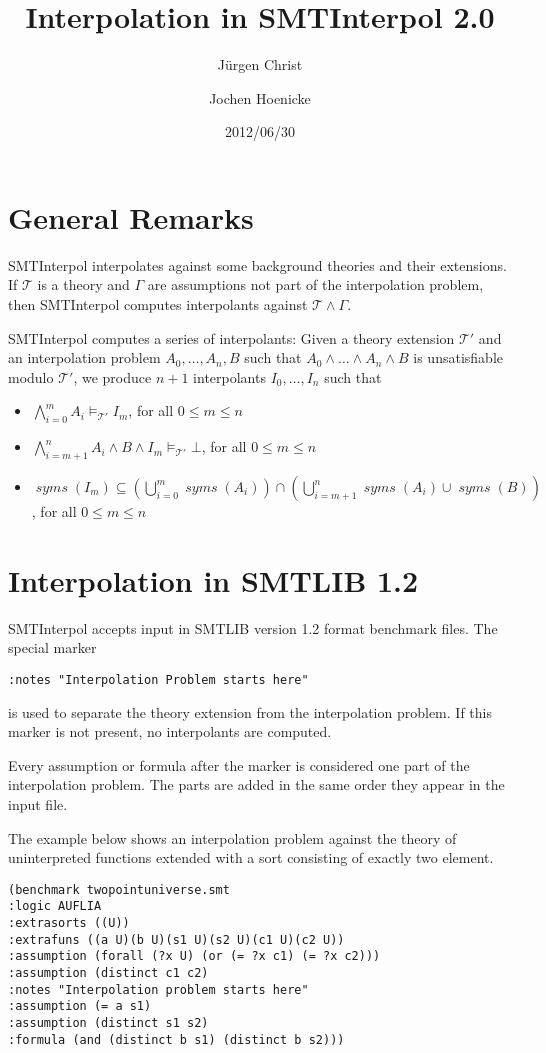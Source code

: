 \documentclass[a4paper,12pt]{article}
\title{Interpolation in SMTInterpol 2.0}
\author{J{\"u}rgen Christ \and Jochen Hoenicke}
\date{2012/06/30}
\newcommand\mT{\mathcal{T}}
\newcommand\T{$\mT$\xspace}
\newcommand\Tp{$\mT'$\xspace}
\newcommand\mtp{\models_{\mT'}}
\newcommand\syms{\mathop{\mathit{syms}}}
\begin{document}
\maketitle
\section{General Remarks}
SMTInterpol interpolates against some background theories and their extensions.
If \T is a theory and $\Gamma$ are assumptions not part of the interpolation
problem, then SMTInterpol computes interpolants against $\mT\wedge\Gamma$.

SMTInterpol computes a series of interpolants:
Given a theory extension \Tp and an interpolation problem
$A_0,\ldots,A_n,B$ such that $A_0\wedge\ldots\wedge A_n\wedge B$ is
unsatisfiable modulo \Tp, we produce $n+1$ interpolants $I_0,\ldots,I_n$ such
that
\begin{itemize}
\item $\bigwedge_{i=0}^mA_i\mtp I_m$, for all $0\le m\le n$
\item $\bigwedge_{i=m+1}^nA_i\wedge B\wedge I_m\mtp\bot$, for all $0\le m\le n$
\item $\syms(I_m)\subseteq(\bigcup_{i=0}^m\syms(A_i))\cap
  (\bigcup_{i=m+1}^n\syms(A_i)\cup\syms(B))$, for all $0\le m\le n$
\end{itemize}
\section{Interpolation in SMTLIB 1.2}
SMTInterpol accepts input in SMTLIB version 1.2 format benchmark files.
The special marker
\begin{verbatim}
:notes "Interpolation Problem starts here"
\end{verbatim}
is used to separate the theory extension from the interpolation problem.
If this marker is not present, no interpolants are computed.

Every assumption or formula after the marker is considered one part of the
interpolation problem.
The parts are added in the same order they appear in the input file.

The example below shows an interpolation problem against the theory of
uninterpreted functions extended with a sort consisting of exactly two element.

\begin{verbatim}
(benchmark twopointuniverse.smt
:logic AUFLIA
:extrasorts ((U))
:extrafuns ((a U)(b U)(s1 U)(s2 U)(c1 U)(c2 U))
:assumption (forall (?x U) (or (= ?x c1) (= ?x c2)))
:assumption (distinct c1 c2)
:notes "Interpolation problem starts here"
:assumption (= a s1)
:assumption (distinct s1 s2)
:formula (and (distinct b s1) (distinct b s2)))
\end{verbatim}
\end{document}
